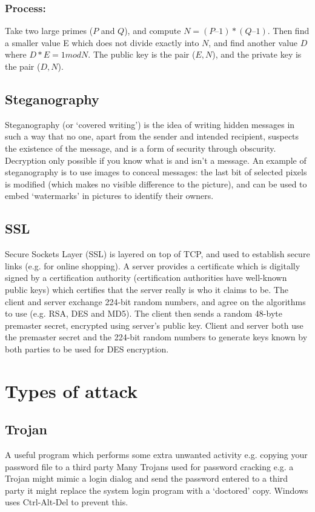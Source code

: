 \documentclass[a4paper,oneside]{report}
\begin{document}
    	\subsubsection{Process:} Take two large primes ($P$ and $Q$), and compute $N = (P – 1) * (Q – 1)$. Then find a smaller value E which does not divide exactly into $N$, and find another value $D$ where $D * E = 1 mod N$. The public key is the pair ($E,N$), and the private key is the pair ($D,N$).
    	
    	\subsection{Steganography}
    	
    	Steganography (or `covered writing') is the idea of writing hidden messages in such a way that no one, apart from the sender and intended recipient, suspects the existence of the message, and is a form of security through obscurity. Decryption only possible if you know what is and isn’t a message. An example of steganography is to use images to conceal messages: the last bit of selected pixels is modified (which makes no visible difference to the picture), and can be used to embed `watermarks' in pictures to identify their owners.
    	
    	\subsection{SSL}
    	
    	Secure Sockets Layer (SSL) is layered on top of TCP, and used to establish secure links (e.g. for  online shopping). A server provides a certificate which is digitally signed by a certification authority (certification authorities have well-known public keys) which certifies that the server really is who it claims to be. The client and server exchange 224-bit random numbers, and agree on the algorithms to use (e.g. RSA, DES and MD5). The client then sends a random 48-byte premaster secret, encrypted using server’s public key. Client and server both use the premaster secret and the 224-bit random numbers to generate keys known by both parties to be used for DES encryption.
    	
\section{Types of attack}
	    	\subsection{Trojan}
 		 A useful program which performs some extra unwanted activity e.g. copying your password file to a third party Many Trojans used for password cracking e.g. a Trojan might mimic a login dialog and send the password entered to a third party it might replace the system login program with a ‘doctored’ copy. Windows uses Ctrl-Alt-Del to prevent this.
\end{document}
